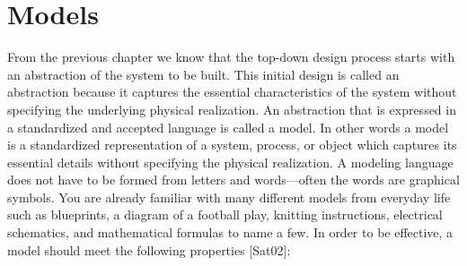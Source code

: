 \section{Models}
\label{section:models}

From the previous chapter we know that the top-down design process
starts with an abstraction of the system to be built. This initial
design is called an abstraction because it captures the essential
characteristics of the system without specifying the underlying physical
realization. An abstraction that is expressed in a standardized and
accepted language is called a model. In other words a model is a
standardized representation of a system, process, or object which
captures its essential details without specifying the physical
realization. A modeling language does not have to be formed from letters
and words---often the words are graphical symbols. You are already
familiar with many different models from everyday life such as
blueprints, a diagram of a football play, knitting instructions,
electrical schematics, and mathematical formulas to name a few. In order
to be effective, a model should meet the following properties
{[}Sat02{]}:

